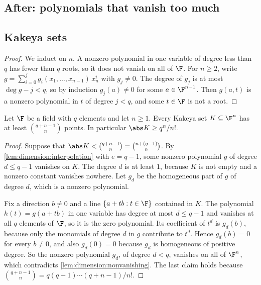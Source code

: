 \begin{refsection}[chapters/09-dimension.bib]
\section{After: polynomials that vanish too much}\label{sec:dimension:after-vanishing}

\subsection{Kakeya sets}\label{sec:dimension:dvir}


\begin{proof}
We induct on $n$. A nonzero polynomial in one variable of degree less than $q$ has fewer than $q$ roots, so it does not vanish on all of $\F$. For $n\ge2$, write $g=\sum_{i=0}^jg_i(x_1,\dots,x_{n-1})\,x_n^i$ with $g_j\ne0$. The degree of $g_j$ is at most $\deg g-j<q$, so by induction $g_j(a)\ne0$ for some $a\in\F^{n-1}$. Then $g(a,t)$ is a nonzero polynomial in $t$ of degree $j<q$, and some $t\in\F$ is not a root.
\end{proof}

\begin{theorem}\label{thm:dimension:dvir}
Let $\F$ be a field with $q$ elements and let $n\ge1$. Every Kakeya set $K\subseteq\F^n$ has at least $\binom{q+n-1}{n}$ points. In particular $\abs K\ge q^n/n!$.
\end{theorem}

\begin{proof}
Suppose that $\abs K<\binom{q+n-1}{n}=\binom{n+(q-1)}{n}$. By \cref{lem:dimension:interpolation} with $e=q-1$, some nonzero polynomial $g$ of degree $d\le q-1$ vanishes on $K$. The degree $d$ is at least $1$, because $K$ is not empty and a nonzero constant vanishes nowhere. Let $g_d$ be the homogeneous part of $g$ of degree $d$, which is a nonzero polynomial.

Fix a direction $b\ne0$ and a line $\{a+tb:t\in\F\}$ contained in $K$. The polynomial $h(t)=g(a+tb)$ in one variable has degree at most $d\le q-1$ and vanishes at all $q$ elements of $\F$, so it is the zero polynomial. Its coefficient of $t^d$ is $g_d(b)$, because only the monomials of degree $d$ in $g$ contribute to $t^d$. Hence $g_d(b)=0$ for every $b\ne0$, and also $g_d(0)=0$ because $g_d$ is homogeneous of positive degree. So the nonzero polynomial $g_d$, of degree $d<q$, vanishes on all of $\F^n$, which contradicts \cref{lem:dimension:nonvanishing}. The last claim holds because $\binom{q+n-1}{n}=q(q+1)\cdots(q+n-1)/n!$.
\end{proof}


\end{refsection}
